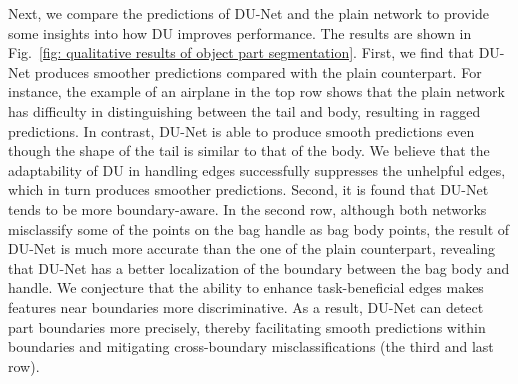 \documentclass[a4paper,fleqn]{cas-dc}
\begin{document}
Next, we compare the predictions of DU-Net and the plain network to provide some insights into how DU improves performance. The results are shown in Fig.~\ref{fig: qualitative results of object part segmentation}. 
First, we find that DU-Net produces smoother predictions compared with the plain counterpart. For instance, the example of an airplane in the top row shows that the plain network has difficulty in distinguishing between the tail and body, resulting in ragged predictions. In contrast, DU-Net is able to produce smooth predictions even though the shape of the tail is similar to that of the body. We believe that the adaptability of DU in handling edges successfully suppresses the unhelpful edges, which in turn produces smoother predictions. 
Second, it is found that DU-Net tends to be more boundary-aware. In the second row, although both networks misclassify some of the points on the bag handle as bag body points, the result of DU-Net is much more accurate than the one of the plain counterpart, revealing that DU-Net has a better localization of the boundary between the bag body and handle. We conjecture that the ability to enhance task-beneficial edges makes features near boundaries more discriminative. As a result, DU-Net can detect part boundaries more precisely, thereby facilitating smooth predictions within boundaries and mitigating cross-boundary misclassifications (the third and last row). 
\end{document}
